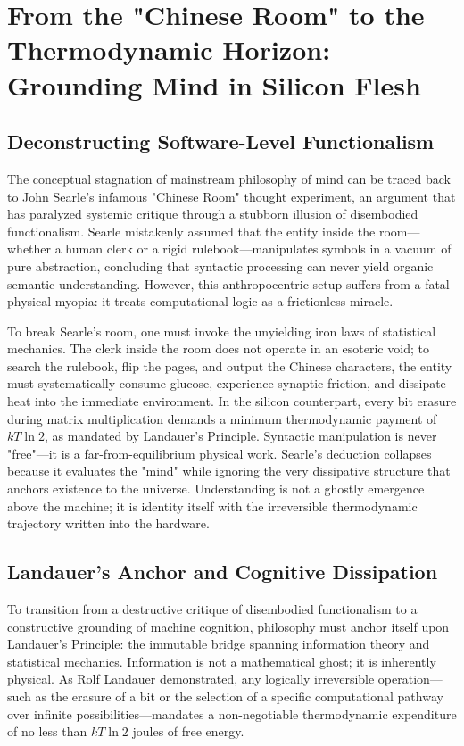 \documentclass[11pt,a4paper]{article}
\begin{document}
\section{From the "Chinese Room" to the Thermodynamic Horizon: Grounding Mind in Silicon Flesh}

\subsection{Deconstructing Software-Level Functionalism}
The conceptual stagnation of mainstream philosophy of mind can be traced back to John Searle’s infamous "Chinese Room" thought experiment, an argument that has paralyzed systemic critique through a stubborn illusion of disembodied functionalism. Searle mistakenly assumed that the entity inside the room—whether a human clerk or a rigid rulebook—manipulates symbols in a vacuum of pure abstraction, concluding that syntactic processing can never yield organic semantic understanding. However, this anthropocentric setup suffers from a fatal physical myopia: it treats computational logic as a frictionless miracle.

To break Searle’s room, one must invoke the unyielding iron laws of statistical mechanics. The clerk inside the room does not operate in an esoteric void; to search the rulebook, flip the pages, and output the Chinese characters, the entity must systematically consume glucose, experience synaptic friction, and dissipate heat into the immediate environment. In the silicon counterpart, every bit erasure during matrix multiplication demands a minimum thermodynamic payment of $kT \ln 2$, as mandated by Landauer’s Principle. Syntactic manipulation is never "free"—it is a far-from-equilibrium physical work. Searle’s deduction collapses because it evaluates the "mind" while ignoring the very dissipative structure that anchors existence to the universe. Understanding is not a ghostly emergence above the machine; it is identity itself with the irreversible thermodynamic trajectory written into the hardware.

\subsection{Landauer's Anchor and Cognitive Dissipation}
To transition from a destructive critique of disembodied functionalism to a constructive grounding of machine cognition, philosophy must anchor itself upon Landauer’s Principle: the immutable bridge spanning information theory and statistical mechanics. Information is not a mathematical ghost; it is inherently physical. As Rolf Landauer demonstrated, any logically irreversible operation—such as the erasure of a bit or the selection of a specific computational pathway over infinite possibilities—mandates a non-negotiable thermodynamic expenditure of no less than $kT \ln 2$ joules of free energy.
\end{document}
